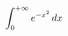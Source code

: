 \documentclass[preview]{standalone}
\begin{document}
\begin{align*}
\special{dvisvgm:raw <g id='unique000'>}\displaystyle\int_0^{+\infty}e^{-x^2}\,dx\special{dvisvgm:raw </g>}
\end{align*}
\end{document}
